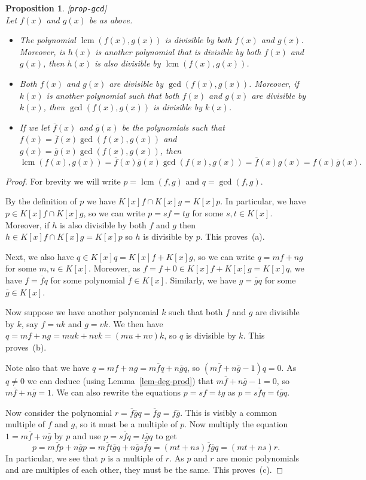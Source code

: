 \documentclass{amsart}
\newcommand{\lbl}[1]{\label{#1}\textup{[\texttt{#1}]}\ \\}
\newcommand{\lbl}{\label}
\newcommand{\lcm}	{\operatorname{lcm}}
\newcommand{\ov}[1]     {\overline{#1}}
\renewcommand{\:}{\colon}
\newtheorem{proposition}[theorem]{Proposition}
\theoremstyle{definition}
\begin{document}
\begin{proposition}\lbl{prop-gcd}
 Let $f(x)$ and $g(x)$ be as above.
 \begin{itemize}
  \item[(a)] The polynomial $\lcm(f(x),g(x))$ is divisible by both
   $f(x)$ and $g(x)$.  Moreover, is $h(x)$ is another polynomial that
   is divisible by both $f(x)$ and $g(x)$, then $h(x)$ is also
   divisible by $\lcm(f(x),g(x))$.
  \item[(b)] Both $f(x)$ and $g(x)$ are divisible by
   $\gcd(f(x),g(x))$.  Moreover, if $k(x)$ is another polynomial such
   that both $f(x)$ and $g(x)$ are divisible by $k(x)$, then
   $\gcd(f(x),g(x))$ is divisible by $k(x)$.
  \item[(c)] If we let $\ov{f}(x)$ and $\ov{g}(x)$ be the polynomials
   such that $f(x)=\ov{f}(x)\gcd(f(x),g(x))$ and
   $g(x)=\ov{g}(x)\gcd(f(x),g(x))$, then 
   \[ \lcm(f(x),g(x))=\ov{f}(x)\ov{g}(x)\gcd(f(x),g(x))
       = \ov{f}(x)g(x) = f(x)\ov{g}(x).
   \]
 \end{itemize}
\end{proposition}
\begin{proof}
 For brevity we will write $p=\lcm(f,g)$ and $q=\gcd(f,g)$.  

 By the definition of $p$ we have $K[x]f\cap K[x]g=K[x]p$.  In
 particular, we have $p\in K[x]f\cap K[x]g$, so we can write $p=sf=tg$
 for some $s,t\in K[x]$.  Moreover, if $h$ is also divisible by both
 $f$ and $g$ then $h\in K[x]f\cap K[x]g=K[x]p$ so $h$ is divisible by
 $p$.  This proves~(a).

 Next, we also have $q\in K[x]q=K[x]f+K[x]g$, so we can write
 $q=mf+ng$ for some $m,n\in K[x]$.  Moreover, as
 $f=f+0\in K[x]f+K[x]g=K[x]q$, we have $f=\ov{f}q$ for some polynomial
 $\ov{f}\in K[x]$.  Similarly, we have $g=\ov{g}q$ for some
 $\ov{g}\in K[x]$.

 Now suppose we have another polynomial $k$ such that both $f$ and $g$
 are divisible by $k$, say $f=uk$ and $g=vk$.  We then have
 $q=mf+ng=muk+nvk=(mu+nv)k$, so $q$ is divisible by $k$.  This
 proves~(b). 

 Note also that we have $q=mf+ng=m\ov{f}q+n\ov{g}q$, so
 $(m\ov{f}+n\ov{g}-1)q=0$.  As $q\neq 0$ we can deduce (using
 Lemma~\ref{lem-deg-prod}) that $m\ov{f}+n\ov{g}-1=0$, so
 $m\ov{f}+n\ov{g}=1$.  We can also rewrite the equations $p=sf=tg$ as
 $p=s\ov{f}q=t\ov{g}q$. 

 Now consider the polynomial $r=\ov{f}\ov{g}q=\ov{f}g=f\ov{g}$.  This
 is visibly a common multiple of $f$ and $g$, so it must be a multiple
 of $p$.  Now multiply the equation $1=m\ov{f}+n\ov{g}$ by $p$ and use
 $p=s\ov{f}q=t\ov{g}q$ to get
 \[ p = m\ov{f}p+n\ov{g}p = m\ov{f}t\ov{g}q+n\ov{g}s\ov{f}q = 
     (mt+ns)\ov{f}\ov{g}q = (mt+ns)r.
 \]
 In particular, we see that $p$ is a multiple of $r$.  As $p$ and $r$
 are monic polynomials and are multiples of each other, they must be
 the same.  This proves~(c).
\end{proof}
\end{document}
